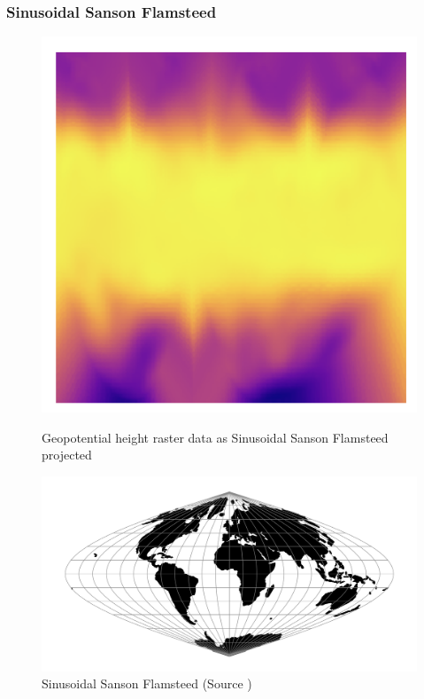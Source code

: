 \subsubsection*{Sinusoidal Sanson Flamsteed}
\begin{figure}[h]
    \centering
    \begin{minipage}{0.30\textwidth}
        \centering
        \includegraphics[width=0.9\linewidth]{figures/chapter-8/geopoth_goode.png}
        \caption{ Geopotential height raster data as Sinusoidal Sanson Flamsteed projected}
        \label{fig:ig_geopoth_raster}
    \end{minipage}\hfill
    \begin{minipage}{0.30\textwidth}
        \centering
        \includegraphics[width=0.9\linewidth]{figures/chapter-8/sinu.png}
        \caption{Sinusoidal Sanson Flamsteed (Source \cite{PROJ_SITE})}

\end{minipage}
\end{figure}
